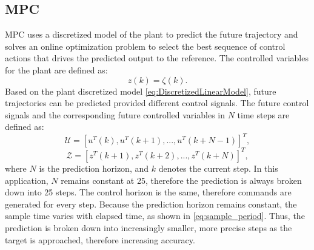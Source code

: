 \documentclass[final]{LTHtwocol} %
\begin{document}
\subsection{MPC}
MPC uses a discretized model of the plant to predict the future trajectory and solves an online optimization problem to select the best sequence of control actions that drives the predicted output to the reference. The controlled variables for the plant are defined as:
\begin{equation}
    z(k) = \zeta(k).
    \label{eq:def_controlled_variable}
\end{equation}
Based on the plant discretized model \eqref{eq:DiscretizedLinearModel}, future trajectories can be predicted provided different control signals. 
The future control signals and the corresponding future controlled variables in $N$ time steps are defined as:
\begin{equation}
    \mathcal{U} = [u^T(k), u^T(k+1), ..., u^T(k+N-1)]^T,
\end{equation}
\begin{equation}
    \mathcal{Z} = [z^T(k+1), z^T(k+2), ..., z^T(k+N)]^T,
\end{equation}
where $N$ is the prediction horizon, and $k$ denotes the current step.
In this application, $N$ remains constant at 25, therefore the prediction is always broken down into 25 steps. The control horizon is the same, therefore commands are generated for every step. Because the prediction horizon remains constant, the sample time varies with elapsed time, as shown in \eqref{eq:sample_period}. Thus, the prediction is broken down into increasingly smaller, more precise steps as the target is approached, therefore increasing accuracy.
\end{document}
